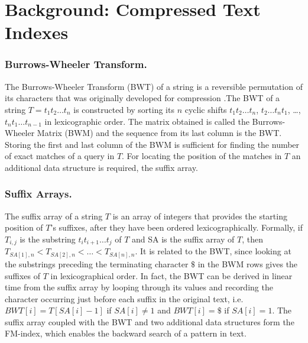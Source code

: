 \documentclass[runningheads,a4paper]{llncs}
\begin{document}
\section{Background: Compressed Text Indexes}

\subsubsection{Burrows-Wheeler Transform.}
The Burrows-Wheeler Transform (BWT) of a string is a reversible permutation of its characters that was originally developed for compression \cite{bwt}.The BWT of a string $T=t_1t_2 \ldots t_n$ is constructed by sorting its $n$ cyclic shifts $t_1t_2 \ldots t_n$, $t_2 \ldots t_n t_1$, \ldots,  $t_n t_1 \ldots t_{n-1}$ in lexicographic order. The matrix obtained is called the Burrows-Wheeler Matrix (BWM) and the sequence from its last column is the BWT. Storing the first and last column of the BWM is sufficient for finding the number of exact matches of a query in $T$. For locating the position of the matches in $T$ an additional data structure is required, the suffix array. 

\subsubsection{Suffix Arrays.} The suffix array of a string $T$ is an array of integers that provides the starting position of $T$'s suffixes, after they have been ordered lexicographically. Formally, if $T_{i,j}$ is the substring $t_i t_{i+1} \ldots t_j$ of $T$ and SA is the suffix array of $T$, then $T_{SA[1],n}<T_{SA[2],n}<\ldots <T_{SA[n],n}$. It is related to the BWT, since looking at the substrings preceding the terminating character $\$$ in the BWM rows gives the suffixes of $T$ in lexicographical order. In fact, the BWT can be derived in linear time from the suffix array by looping through its values and recording the character occurring just before each suffix in the original text, i.e. $BWT[i]=T[SA[i]-1]$ if $SA[i]\neq1$ and $BWT[i]=\$$ if $SA[i]=1$. The suffix array coupled with the BWT and two additional data structures form the FM-index, which enables the backward search of a pattern in text.
\end{document}
